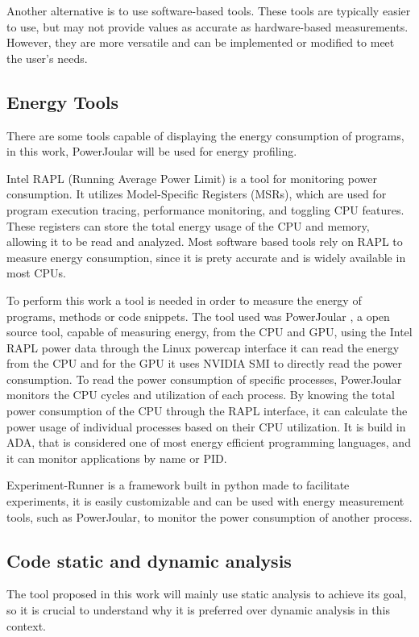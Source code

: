 \documentclass[sigplan]{acmart}
\begin{document}
Another alternative is to use software-based tools. These tools are typically easier to use, but may not provide values as accurate as hardware-based measurements. However, they are more versatile and can be implemented or modified to meet the user's needs. 

\subsection{Energy Tools} \label{sec:background_energy}

There are some tools capable of displaying the energy consumption of programs, in this work, PowerJoular will be used for energy profiling.

Intel RAPL (Running Average Power Limit) is a tool for monitoring power consumption. It utilizes Model-Specific Registers (MSRs), which are used for program execution tracing, performance monitoring, and toggling CPU features. These registers can store the total energy usage of the CPU and memory, allowing it to be read and analyzed. Most software based tools rely on RAPL to measure energy consumption, since it is prety accurate and is widely available in most CPUs.

To perform this work a tool is needed in order to measure the energy of programs, methods or code snippets. The tool used was PowerJoular \cite{noureddine-ie-2022}, a open source tool, capable of measuring energy, from the CPU and GPU, using the Intel RAPL power data through the Linux powercap interface it can read the energy from the CPU and for the GPU it uses NVIDIA SMI to directly read the power consumption.
To read the power consumption of specific processes, PowerJoular monitors the CPU cycles and utilization of each process. By knowing the total power consumption of the CPU through the RAPL interface, it can calculate the power usage of individual processes based on their CPU utilization.
It is build in ADA, that is considered one of most energy efficient programming languages\cite{PEREIRA2021102609}, and it can monitor applications by name or PID.

Experiment-Runner\cite{S2_Group_Experiment_Runner} is a framework built in python made to facilitate experiments, it is easily customizable and can be used with energy measurement tools, such as PowerJoular, to monitor the power consumption of another process.

\subsection{Code static and dynamic analysis} \label{sec:background_static_dynamic_analysis}
The tool proposed in this work will mainly use static analysis to achieve its goal, so it is crucial to understand why it is preferred over dynamic analysis in this context.
\end{document}
